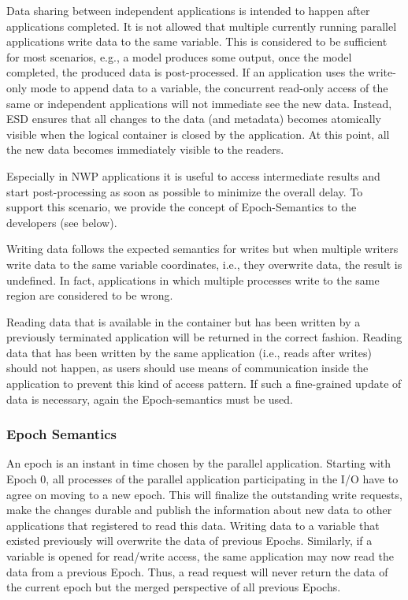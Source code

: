 \documentclass{../../template/esiwace-report}
\begin{document}
Data sharing between independent applications is intended to happen after applications completed.
It is not allowed that multiple currently running parallel applications write data to the same variable.
This is considered to be sufficient for most scenarios, e.g., a model produces some output, once the model completed, the produced data is post-processed.
If an application uses the write-only mode to append data to a variable, the concurrent read-only access of the same or independent applications will not immediate see the new data.
Instead, ESD ensures that all changes to the data (and metadata) becomes atomically visible when the logical container is closed by the application.
At this point, all the new data becomes immediately visible to the readers.

Especially in NWP applications it is useful to access intermediate results and start post-processing as soon as possible to minimize the overall delay.
To support this scenario, we provide the concept of Epoch-Semantics to the developers (see below).

Writing data follows the expected semantics for writes but when multiple writers write data to the same variable coordinates, i.e., they overwrite data, the result is undefined.
In fact, applications in which multiple processes write to the same region are considered to be wrong.

Reading data that is available in the container but has been written by a previously terminated application will be returned in the correct fashion.
Reading data that has been written by the same application (i.e., reads after writes) should not happen, as users should use means of communication inside the application to prevent this kind of access pattern.
If such a fine-grained update of data is necessary, again the Epoch-semantics must be used.


\subsubsection{Epoch Semantics}

An epoch is an instant in time chosen by the parallel application. 
Starting with Epoch 0, all processes of the parallel application participating in the I/O have to agree on moving to a new epoch.
This will finalize the outstanding write requests, make the changes durable and publish the information about new data to other applications that registered to read this data.
Writing data to a variable that existed previously will overwrite the data of previous Epochs.
Similarly, if a variable is opened for read/write access, the same application may now read the data from a previous Epoch.
Thus, a read request will never return the data of the current epoch but the merged perspective of all previous Epochs.
\end{document}
